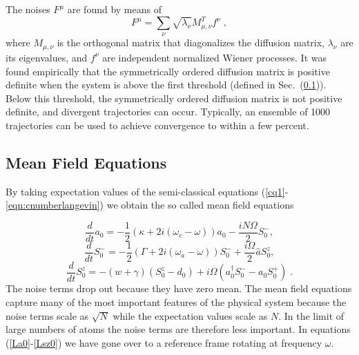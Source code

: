 \documentclass[aps,
twocolumn,
showpacs,
superscriptaddress,groupedaddress]{revtex4}
\begin{document}
The noises $F^\mu$ are found by means of
\begin{equation}
F^\mu=\sum_\nu \sqrt{\lambda_\nu} M_{\mu,\nu}^T f^\nu\;,
\end{equation}
where $M_{\mu,\nu}$ is the orthogonal matrix that
diagonalizes the diffusion matrix, $\lambda_\nu$ are its eigenvalues,
and $f^\nu$ are independent normalized Wiener processes.
It was found empirically that the symmetrically ordered diffusion matrix is positive definite when the system is above the first threshold (defined in Sec.~(\ref{MFE})). Below this threshold, the symmetrically ordered diffusion matrix is not positive definite, and divergent trajectories can occur. Typically, an ensemble of 1000 trajectories can be used to achieve convergence to within a few percent.


\subsection{Mean Field Equations}
\label{MFE}

By taking expectation values of the semi-classical equations
(\ref{cq1}-\ref{eqn:cnumberlangevin}) we obtain the so called mean field
equations

\begin{equation}
\frac{d}{dt} a_0= -\frac{1}{2} (\kappa +2i(\omega_c-\omega)) a_0
-\frac{i N \Omega}{2} S_0^{-},
\label{La0}
\end{equation}
\begin{equation}
\frac{d}{dt} S_0^{-} =
-\frac{1}{2} \left(\Gamma +2 i (\omega_a-\omega) \right)  S_0^{-}
+\frac{i \Omega}{2} \hat{a} S_0^{z},
\end{equation}
\begin{equation}
\frac{d}{dt} S_0^{z} = -(w+\gamma)\left( S_0^{z} - d_0\right)
+i\Omega \left( a_0^{\dagger} S_0^{-} - a_0 S_0^{+} \right)\;.
\label{Lsz0}
\end{equation}
The noise terms drop out because they have zero mean.
The mean field equations capture many of the most important features of the
physical system because the noise terms scale as $\sqrt{N}$ while the
expectation values scale as $N$.  In the limit of large numbers of atoms
the noise terms are therefore less important.  In equations
(\ref{La0}-\ref{Lsz0}) we have gone over to a reference frame rotating
at frequency $\omega$.
\end{document}
